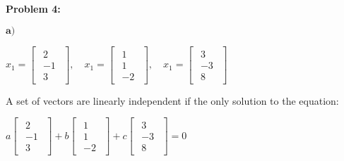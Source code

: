 \textbf{Problem 4:}

\singlespacing

$\textbf{a)}$

\singlespacing

\begin{math}
    x_1 = \begin{bmatrix}
        \begin{array}{c}
            2  \\
            -1 \\
            3
        \end{array}
    \end{bmatrix},\quad
    x_1 = \begin{bmatrix}
        \begin{array}{c}
            1 \\
            1 \\
            -2
        \end{array}
    \end{bmatrix},\quad
    x_1 = \begin{bmatrix}
        \begin{array}{c}
            3  \\
            -3 \\
            8
        \end{array}
    \end{bmatrix}
\end{math}

\singlespacing
\singlespacing

A set of vectors are linearly independent if the only solution to the equation:

\singlespacing
\singlespacing

\begin{math}
    a \begin{bmatrix}
        \begin{array}{c}
            2  \\
            -1 \\
            3
        \end{array}
    \end{bmatrix}
    +b \begin{bmatrix}
        \begin{array}{c}
            1 \\
            1 \\
            -2
        \end{array}
    \end{bmatrix}
    +c \begin{bmatrix}
        \begin{array}{c}
            3  \\
            -3 \\
            8
        \end{array}
    \end{bmatrix}
    = 0
\end{math}

